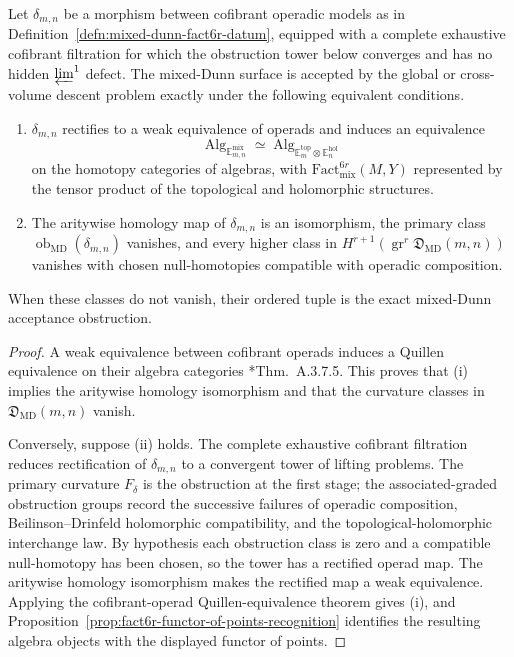 \begin{thm}\label{thm:mixed-dunn-criterion}
  Let \(\delta_{m,n}\) be a morphism between cofibrant operadic models as
  in Definition~\ref{defn:mixed-dunn-fact6r-datum}, equipped with a
  complete exhaustive cofibrant filtration for which the obstruction
  tower below converges and has no hidden \(\varprojlim^1\) defect.  The mixed-Dunn
  surface is accepted by the global or cross-volume descent problem exactly
  under the following equivalent conditions.
  \begin{enumerate}[label=(\roman*)]
    \item \(\delta_{m,n}\) rectifies to a weak equivalence of operads and
      induces an equivalence
      \[
        \operatorname{Alg}_{\mathbb E_{m,n}^{\mathrm{mix}}}
          \simeq
        \operatorname{Alg}_{\mathbb E_m^{\mathrm{top}}\otimes
          \mathbb E_n^{\mathrm{hol}}}
      \]
      on the homotopy categories of algebras, with
      \(\mathrm{Fact}^{6r}_{\mathrm{mix}}(M,Y)\) represented by the
      tensor product of the topological and holomorphic structures.
    \item The aritywise homology map of \(\delta_{m,n}\) is an
      isomorphism, the primary class
      \(\operatorname{ob}_{\mathrm{MD}}(\delta_{m,n})\) vanishes, and
      every higher class in
      \(H^{r+1}(\operatorname{gr}^r\mathfrak D_{\mathrm{MD}}(m,n))\)
      vanishes with chosen null-homotopies compatible with operadic
      composition.
  \end{enumerate}
  When these classes do not vanish, their ordered tuple is the exact
  mixed-Dunn acceptance obstruction.
\end{thm}

\begin{proof}
  A weak equivalence between cofibrant operads induces a Quillen
  equivalence on their algebra categories
  \cite{lurie-ha}*{Thm.~A.3.7.5}.  This proves that (i) implies the
  aritywise homology isomorphism and that the curvature classes in
  \(\mathfrak D_{\mathrm{MD}}(m,n)\) vanish.

  Conversely, suppose (ii) holds.  The complete exhaustive cofibrant
  filtration reduces rectification of \(\delta_{m,n}\) to a convergent
  tower of lifting problems.  The
  primary curvature \(F_\delta\) is the obstruction at the first stage;
  the associated-graded obstruction groups record the successive
  failures of operadic composition, Beilinson--Drinfeld holomorphic
  compatibility, and the topological-holomorphic interchange law.  By
  hypothesis each obstruction class is zero and a compatible
  null-homotopy has been chosen, so the tower has a rectified operad map.
  The aritywise homology isomorphism makes the rectified map a weak
  equivalence.  Applying the cofibrant-operad Quillen-equivalence theorem
  gives (i), and Proposition~\ref{prop:fact6r-functor-of-points-recognition}
  identifies the resulting algebra objects with the displayed functor of
  points.
\end{proof}

